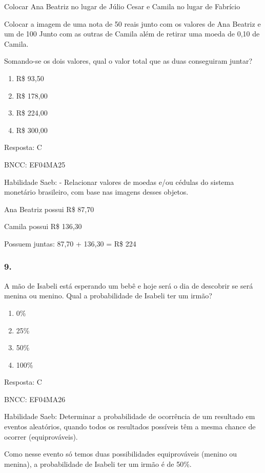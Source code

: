 Colocar Ana Beatriz no lugar de Júlio Cesar e Camila no lugar de
Fabrício

Colocar a imagem de uma nota de 50 reais junto com os valores de Ana
Beatriz e um de 100 Junto com as outras de Camila além de retirar uma
moeda de 0,10 de Camila.

Somando-se os dois valores, qual o valor total que as duas conseguiram
juntar?

\begin{enumerate}
\def\labelenumi{\alph{enumi})}
\item
  R\$ 93,50
\item
  R\$ 178,00
\item
  R\$ 224,00
\item
  R\$ 300,00
\end{enumerate}

Resposta: C

BNCC: EF04MA25

Habilidade Saeb: - Relacionar valores de moedas e/ou cédulas do sistema
monetário brasileiro, com base nas imagens desses objetos.

Ana Beatriz possui R\$ 87,70

Camila possui R\$ 136,30

Possuem juntas: 87,70 + 136,30 = R\$ 224

\subsubsection{9.}\label{section-150}

A mão de Isabeli está esperando um bebê e hoje será o dia de descobrir
se será menina ou menino. Qual a probabilidade de Isabeli ter um irmão?

\begin{enumerate}
\def\labelenumi{\alph{enumi})}
\item
  0\%
\item
  25\%
\item
  50\%
\item
  100\%
\end{enumerate}

Resposta: C

BNCC: EF04MA26

Habilidade Saeb: Determinar a probabilidade de ocorrência de um
resultado em eventos aleatórios, quando todos os resultados possíveis
têm a mesma chance de ocorrer (equiprováveis).

Como nesse evento só temos duas possibilidades equiprováveis (menino ou
menina), a probabilidade de Isabeli ter um irmão é de 50\%.

